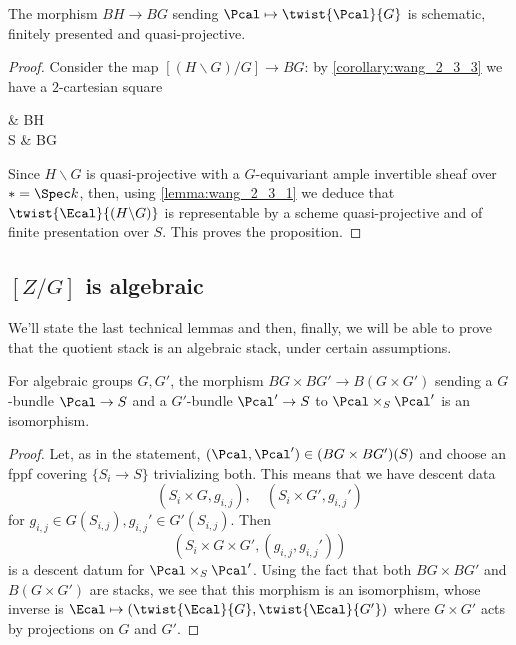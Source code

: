             \begin{prop}
                \label{prop:wang_2_4_1}
                The morphism $BH \to BG$ sending $\Pcal \mapsto \twist{\Pcal}{G}$ is schematic, finitely presented and quasi-projective.
            \end{prop}
            \begin{proof}
                Consider the map $[(H \backslash G)/G] \to BG$: by \cref{corollary:wang_2_3_3} we have a $2$-cartesian square 
                \begin{diag}
                     \ar[d] \ar[r] & BH \simeq {} \ar[d] \\
                    S \ar[r, "\Ecal"] & BG
                \end{diag}
                Since $H \backslash G$ is quasi-projective with a $G$-equivariant ample invertible sheaf over $* = \Spec k$, then, using \cref{lemma:wang_2_3_1} we deduce that $\twist{\Ecal}{(H \backslash G)}$ is representable by a scheme quasi-projective and of finite presentation over $S$. This proves the proposition.
            \end{proof}

        \subsection{\texorpdfstring{$[Z/G]$ is algebraic}{Quotient stack is algebraic}}
            We'll state the last technical lemmas and then, finally, we will be able to prove that the quotient stack is an algebraic stack, under certain assumptions.
            \begin{lemma}
                \label{lemma:wang_2_5_1}
                For algebraic groups $G, G'$, the morphism $BG \times BG' \to B(G \times G')$ sending a $G$-bundle $\Pcal \to S$ and a $G'$-bundle $\Pcal' \to S$ to $\Pcal \times_S \Pcal'$ is an isomorphism.
            \end{lemma}
            \begin{proof}
                Let, as in the statement, $(\Pcal, \Pcal') \in (BG \times BG')(S)$ and choose an fppf covering $\{S_i \to S\}$ trivializing both. This means that we have descent data \[(S_i \times G, g_{i,j}), \quad (S_i \times G', g_{i,j}') \] for $g_{i,j} \in G(S_{i,j}), g_{i,j}' \in G'(S_{i,j})$. Then \[(S_i \times G \times G', (g_{i,j}, g_{i,j}')) \] is a descent datum for $\Pcal \times_S \Pcal'$. Using the fact that both $BG \times BG'$ and $B(G \times G')$ are stacks, we see that this morphism is an isomorphism, whose inverse is $\Ecal \mapsto (\twist{\Ecal}{G}, \twist{\Ecal}{G'})$ where $G \times G'$ acts by projections on $G$ and $G'$.
            \end{proof}
            
